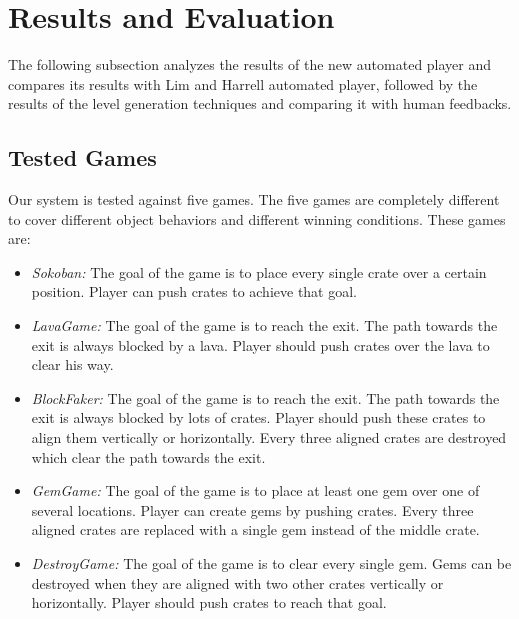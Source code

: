 \documentclass[letterpaper]{article}
\begin{document}
\section{Results and Evaluation}
The following subsection analyzes the results of the new automated player and compares its results with Lim and Harrell automated player\cite{puzzleScriptGeneration}, followed by the results of the level generation techniques and comparing it with human feedbacks.

\subsection{Tested Games}
Our system is tested against five games. The five games are completely different to cover different object behaviors and different winning conditions. These games are:
\begin{itemize} \itemsep0pt \parskip0pt 
	\item \emph{Sokoban:} The goal of the game is to place every single crate over a certain position. Player can push crates to achieve that goal.
	\item \emph{LavaGame:} The goal of the game is to reach the exit. The path towards the exit is always blocked by a lava. Player should push crates over the lava to clear his way.
	\item \emph{BlockFaker:} The goal of the game is to reach the exit. The path towards the exit is always blocked by lots of crates. Player should push these crates to align them vertically or horizontally. Every three aligned crates are destroyed which clear the path towards the exit.
	\item \emph{GemGame:} The goal of the game is to place at least one gem over one of several locations. Player can create gems by pushing crates. Every three aligned crates are replaced with a single gem instead of the middle crate.
	\item \emph{DestroyGame:} The goal of the game is to clear every single gem. Gems can be destroyed when they are aligned with two other crates vertically or horizontally. Player should push crates to reach that goal.
\end{itemize}
\end{document}
